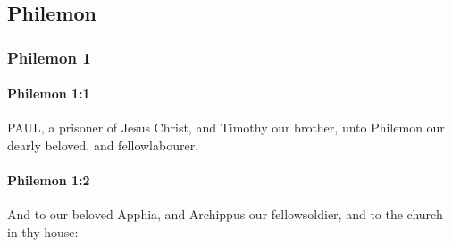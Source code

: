 \subsection{Philemon}
	\label{PHILEMON}

	\subsubsection{Philemon 1} %
		\label{PHILEMON-1}
	
		\paragraph{Philemon 1:1} %
			\label{PHILEMON-1-1}

			PAUL, a prisoner of Jesus Christ, and Timothy our brother, unto Philemon our dearly beloved, and fellowlabourer,

			\begin{framed}
			\scriptsize
				\begin{compactdesc}
					\item[SBLG] 
				\end{compactdesc}
			\end{framed}

		\paragraph{Philemon 1:2} %
			\label{PHILEMON-1-2}

			And to our beloved Apphia, and Archippus our fellowsoldier, and to the church in thy house:


